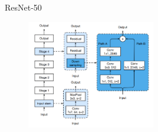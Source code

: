 \begin{frame}{ResNet-50}
    \begin{figure}[H]
        \centering
        \includegraphics[width=0.5\textwidth]{img/01-resnet_50.png}
        \label{fig:resnet_50}
    \end{figure}
\end{frame}

